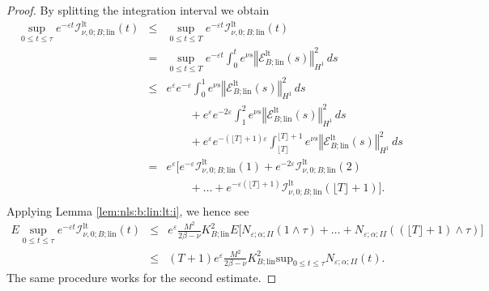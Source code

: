\documentclass[10pt]{articleHJ}
\newcommand{\e}{\ensuremath{\varepsilon}}
\newcommand{\norm}[1]{\left\Vert#1\right\Vert}		%
\numberwithin{equation}{section}
\begin{document}
\begin{proof}
By splitting the integration interval we obtain
\begin{equation}
\begin{array}{lcl}
\sup_{0 \le t \le \tau}
    e^{-\e t} \mathcal{I}^{\mathrm{lt}}_{\nu,0;B; \mathrm{lin}}(t)
  & \le   &
  \sup_{0 \le t \le T}
    e^{-\e t} \mathcal{I}^{\mathrm{lt}}_{\nu, 0;B; \mathrm{lin}}(t)
\\[0.2cm]
& = &
   \sup_{0 \le t \le T}
    e^{-\e t}
      \int_0^t e^{ \nu s}
        \norm{\mathcal{E}^{\mathrm{lt}}_{B;\mathrm{lin}}(s)}_{H^1}^2 \, ds
\\[0.2cm]
& \le &
    e^{\e}   e^{-\e} \int_0^{1 }
     e^{ \nu s}
       \norm{\mathcal{E}^{\mathrm{lt}}_{B;\mathrm{lin}}(s)}_{H^1}^2 \, ds
\\[0.2cm]
& & \qquad
  + e^{\e}  e^{-2 \e}\int_1^{2 }
       e^{ \nu s}
       \norm{\mathcal{E}^{\mathrm{lt}}_{B;\mathrm{lin}}(s)}_{H^1}^2 \, ds
\\[0.2cm]
& & \qquad
  + e^{\e}  e^{- (\lfloor T \rfloor + 1) \e}
     \int_{\lfloor T \rfloor}^{\lfloor T \rfloor + 1}
        e^{ \nu s}
       \norm{\mathcal{E}^{\mathrm{lt}}_{B;\mathrm{lin}}(s)}_{H^1}^2 \, ds
\\[0.2cm]
& = & e^{\e}
\big[
     e^{-\e }\mathcal{I}^{\mathrm{lt}}_{\nu,0;B; \mathrm{lin}}(1)
  +  e^{-2\e }\mathcal{I}^{\mathrm{lt}}_{\nu,0;B; \mathrm{lin}}(2)
\\[0.2cm]
& & \qquad
  + \ldots
  +  e^{-\e (\lfloor T \rfloor + 1)} \mathcal{I}^{\mathrm{lt}}_{\nu,0;B; \mathrm{lin}}
       (\lfloor T \rfloor + 1)
\big] .
\\[0.2cm]
\end{array}
\end{equation}
Applying Lemma \ref{lem:nls:b:lin:lt:i},
we hence see
\begin{equation}
\begin{array}{lcl}
E \sup_{0 \le t \le \tau}
    e^{-\e t}\mathcal{I}^{\mathrm{lt}}_{\nu, 0;B; \mathrm{lin}}(t)
& \le &
e^{\e} \frac{M^2}{2 \beta - \nu} K_{B;\mathrm{lin}}^2
E
\big[
  N_{\e;\alpha;II}(1 \wedge \tau)
  + \ldots + N_{\e;\alpha;II}((\lfloor T \rfloor + 1) \wedge \tau)
\big]
\\[0.2cm]
& \le &
(T + 1) e^{\e} \frac{M^2}{2 \beta - \nu} K_{B;\mathrm{lin}}^2
\mathrm{sup}_{0 \le t \le \tau} N_{\e;\alpha;II}(t) .
\end{array}
\end{equation}
The same procedure works for the second estimate.
\end{proof}
\end{document}
